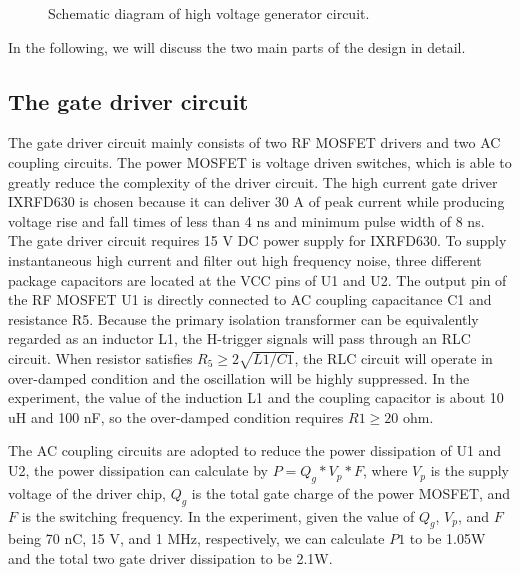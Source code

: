 \documentclass[aip,rsi,reprint,graphicx]{revtex4-1} %
\begin{document}
\begin{figure}[hbt]
\caption{Schematic diagram of high voltage generator circuit.\label{Fig1}}%
\end{figure}

In the following, we will discuss the two main parts of the design in detail.

\subsection{The gate driver circuit}
The gate driver circuit mainly consists of two RF MOSFET drivers and two AC coupling circuits.
 The power MOSFET is voltage driven switches, which is able to greatly reduce the complexity of the driver circuit.
 The high current gate driver IXRFD630 is chosen because it can deliver 30 A of peak current while producing voltage rise and fall times of less than 4 ns and minimum pulse width of 8 ns.
 The gate driver circuit requires 15 V DC power supply for IXRFD630.
 To supply instantaneous high current and filter out high frequency noise, three different package capacitors are located at the VCC pins of U1 and U2.
	The output pin of the RF MOSFET U1 is directly connected to AC coupling capacitance C1 and resistance R5. Because the primary isolation transformer can be equivalently regarded as an inductor L1, the H-trigger signals will pass through an RLC circuit. When resistor satisfies $R_5\ge 2\sqrt{L1/C1}$, the RLC circuit will operate in over-damped condition and the oscillation will be highly suppressed. In the experiment, the value of the induction L1 and the coupling capacitor is about 10 uH and 100 nF, so the over-damped condition requires $R1\ge20$ ohm.

	The AC coupling circuits are adopted to reduce the power dissipation of U1 and U2, the power dissipation can calculate by $P= Q_{g}*V_{p}*F$, where $V_{p}$ is the supply voltage of the driver chip, $Q_{g}$ is the total gate charge of the power MOSFET, and $F$ is the switching frequency. In the experiment, given the value of $Q_{g}$, $V_{p}$, and $F$ being 70 nC, 15 V, and  1 MHz, respectively, we can calculate $P1$ to be 1.05W and the total two gate driver dissipation to be 2.1W.
\end{document}
